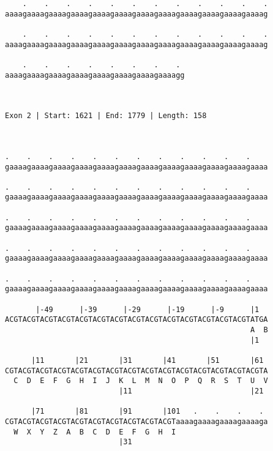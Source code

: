 \documentclass{article}
\begin{document}
\begin{Verbatim}
    .    .    .    .    .    .    .    .    .    .    .    .
aaaagaaaagaaaagaaaagaaaagaaaagaaaagaaaagaaaagaaaagaaaagaaaag
                                                            
    .    .    .    .    .    .    .    .    .    .    .    .
aaaagaaaagaaaagaaaagaaaagaaaagaaaagaaaagaaaagaaaagaaaagaaaag
                                                            
    .    .    .    .    .    .    .    . 
aaaagaaaagaaaagaaaagaaaagaaaagaaaagaaaagg
                                         
                                         
 
Exon 2 | Start: 1621 | End: 1779 | Length: 158



.    .    .    .    .    .    .    .    .    .    .    .    
gaaaagaaaagaaaagaaaagaaaagaaaagaaaagaaaagaaaagaaaagaaaagaaaa
                                                            
.    .    .    .    .    .    .    .    .    .    .    .    
gaaaagaaaagaaaagaaaagaaaagaaaagaaaagaaaagaaaagaaaagaaaagaaaa
                                                            
.    .    .    .    .    .    .    .    .    .    .    .    
gaaaagaaaagaaaagaaaagaaaagaaaagaaaagaaaagaaaagaaaagaaaagaaaa
                                                            
.    .    .    .    .    .    .    .    .    .    .    .    
gaaaagaaaagaaaagaaaagaaaagaaaagaaaagaaaagaaaagaaaagaaaagaaaa
                                                            
.    .    .    .    .    .    .    .    .    .    .    .    
gaaaagaaaagaaaagaaaagaaaagaaaagaaaagaaaagaaaagaaaagaaaagaaaa
                                                            
       |-49      |-39      |-29      |-19      |-9      |1  
ACGTACGTACGTACGTACGTACGTACGTACGTACGTACGTACGTACGTACGTACGTATGA
                                                        A  B
                                                        |1  
  
      |11       |21       |31       |41       |51       |61 
CGTACGTACGTACGTACGTACGTACGTACGTACGTACGTACGTACGTACGTACGTACGTA
  C  D  E  F  G  H  I  J  K  L  M  N  O  P  Q  R  S  T  U  V
                          |11                           |21 
  
      |71       |81       |91       |101   .    .    .    . 
CGTACGTACGTACGTACGTACGTACGTACGTACGTACGTaaaagaaaagaaaagaaaaga
  W  X  Y  Z  A  B  C  D  E  F  G  H  I                     
                          |31                               
  

\end{Verbatim}
\end{document}
